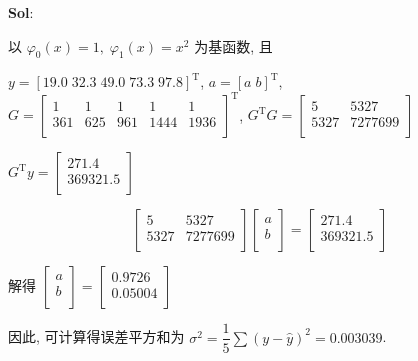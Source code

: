 \textbf{Sol}:  

以 $\varphi_0(x)=1,\;\varphi_1(x)=x^2$ 为基函数, 且

$y=[19.0\;32.3\;49.0\;73.3\;97.8]^{\text{T}}$, $a=[a\;b]^{\text{T}}$, $G=\begin{bmatrix}
    1&1&1&1&1\\
    361&625&961&1444&1936\\
\end{bmatrix}^{\text{T}}$, $G^{\text{T}}G=\begin{bmatrix}
    5&5327\\
    5327&7277699\\
\end{bmatrix}$

$G^{\text{T}}y=\begin{bmatrix}
    271.4\\369321.5\\
\end{bmatrix}$

$$
\begin{bmatrix}
    5&5327\\
    5327&7277699\\
\end{bmatrix}\begin{bmatrix}
    a\\b\\
\end{bmatrix}=\begin{bmatrix}
    271.4\\369321.5\\
\end{bmatrix}
$$

解得 $\begin{bmatrix}
    a\\b\\
\end{bmatrix}=\begin{bmatrix}
    0.9726\\0.05004\\
\end{bmatrix}$

因此, 可计算得误差平方和为 $\sigma^2=\dfrac{1}{5}\sum(y-\hat{y})^2=0.003039$.

\vspace{12pt}



